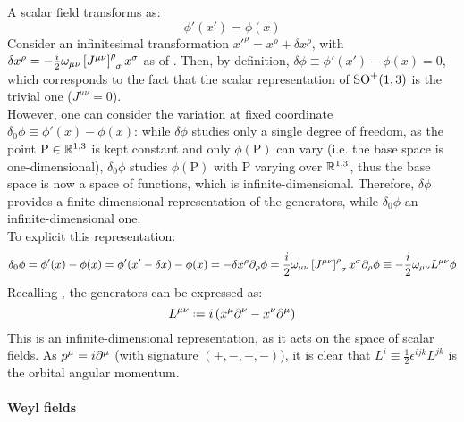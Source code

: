 A scalar field transforms as:
\begin{equation}
  \phi'(x') = \phi(x)
\end{equation}
Consider an infinitesimal transformation $ x'^\rho = x^\rho + \delta x^\rho $, with $ \delta x^\rho = - \frac{i}{2} \omega_{\mu \nu} \tensor{\left[ J^{\mu \nu} \right]}{^\rho_\sigma} x^\sigma $ as of . Then, by definition, $ \delta \phi \equiv \phi'(x') - \phi(x) = 0 $, which corresponds to the fact that the scalar representation of $ \mathrm{SO}^+(1,3) $ is the trivial one ($ J^{\mu \nu} = 0 $).\\
However, one can consider the variation at fixed coordinate $ \delta_0 \phi \equiv \phi'(x) - \phi(x) $: while $ \delta \phi $ studies only a single degree of freedom, as the point $ \text{P} \in \mathbb{R}^{1,3} $ is kept constant and only $ \phi(\text{P}) $ can vary (i.e. the base space is one-dimensional), $ \delta_0 \phi $ studies $ \phi(\text{P}) $ with $ \text{P} $ varying over $ \mathbb{R}^{1,3} $, thus the base space is now a space of functions, which is infinite-dimensional. Therefore, $ \delta \phi $ provides a finite-dimensional representation of the generators, while $ \delta_0 \phi $ an infinite-dimensional one.\\
To explicit this representation:
\begin{equation*}
  \delta_0 \phi = \phi'(x) - \phi(x) = \phi'(x' - \delta x) - \phi(x) = - \delta x^\rho \pa_\rho \phi = \frac{i}{2} \omega_{\mu \nu} \tensor{\left[ J^{\mu \nu} \right]}{^\rho_\sigma} x^\sigma \pa_\rho \phi \equiv - \frac{i}{2} \omega_{\mu \nu} L^{\mu \nu} \phi
\end{equation*}
Recalling , the generators can be expressed as:
\begin{equation}
  L^{\mu \nu} \defeq i \left( x^\mu \pa^\nu - x^\nu \pa^\mu \right)
  \label{eq:ang-mom-oper}
\end{equation}
This is an infinite-dimensional representation, as it acts on the space of scalar fields. As $ p^\mu = i \partial^\mu $ (with signature $ (+,-,-,-) $), it is clear that $ L^i \equiv \frac{1}{2} \epsilon^{ijk} L^{jk} $ is the orbital angular momentum.

\paragraph{Weyl fields}

